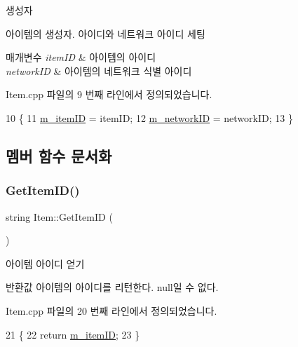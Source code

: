 생성자 

아이템의 생성자. 아이디와 네트워크 아이디 세팅


\begin{DoxyParams}{매개변수}
{\em item\+ID} & 아이템의 아이디 \\
\hline
{\em network\+ID} & 아이템의 네트워크 식별 아이디 \\
\hline
\end{DoxyParams}


Item.\+cpp 파일의 9 번째 라인에서 정의되었습니다.


\begin{DoxyCode}
10 \{
11     \hyperlink{class_item_a8a89e78c25c95fe6f27d61d2416df1e5}{m\_itemID} = itemID;
12     \hyperlink{class_item_a3e5eae9a0cc3f98e421bc065c5b6f906}{m\_networkID} = networkID;
13 \}
\end{DoxyCode}


\subsection{멤버 함수 문서화}
\mbox{\label{class_item_a449b9493c2980231cd23633d935568e0}} 
\subsubsection{\texorpdfstring{Get\+Item\+I\+D()}{GetItemID()}}
{\footnotesize\ttfamily string Item\+::\+Get\+Item\+ID (\begin{DoxyParamCaption}{ }\end{DoxyParamCaption})}



아이템 아이디 얻기 

\begin{DoxyReturn}{반환값}
아이템의 아이디를 리턴한다. null일 수 없다. 
\end{DoxyReturn}


Item.\+cpp 파일의 20 번째 라인에서 정의되었습니다.


\begin{DoxyCode}
21 \{
22     \textcolor{keywordflow}{return} \hyperlink{class_item_a8a89e78c25c95fe6f27d61d2416df1e5}{m\_itemID};
23 \}
\end{DoxyCode}
\mbox{\label{class_item_ab3ee43a2b973e4a595e65ce44c68ad18}} 

